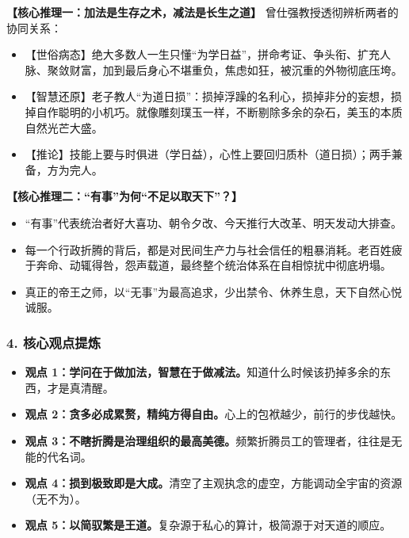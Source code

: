 \noindent\textbf{【核心推理一：加法是生存之术，减法是长生之道】}
曾仕强教授透彻辨析两者的协同关系：
\begin{itemize}
    \item 【世俗病态】绝大多数人一生只懂“为学日益”，拼命考证、争头衔、扩充人脉、聚敛财富，加到最后身心不堪重负，焦虑如狂，被沉重的外物彻底压垮。
    \item 【智慧还原】老子教人“为道日损”：损掉浮躁的名利心，损掉非分的妄想，损掉自作聪明的小机巧。就像雕刻璞玉一样，不断剔除多余的杂石，美玉的本质自然光芒大盛。
    \item 【推论】技能上要与时俱进（学日益），心性上要回归质朴（道日损）；两手兼备，方为完人。
\end{itemize}

\noindent\textbf{【核心推理二：“有事”为何“不足以取天下”？】}
\begin{itemize}
    \item “有事”代表统治者好大喜功、朝令夕改、今天推行大改革、明天发动大排查。
    \item 每一个行政折腾的背后，都是对民间生产力与社会信任的粗暴消耗。老百姓疲于奔命、动辄得咎，怨声载道，最终整个统治体系在自相惊扰中彻底坍塌。
    \item 真正的帝王之师，以“无事”为最高追求，少出禁令、休养生息，天下自然心悦诚服。
\end{itemize}

\subsubsection{4. 核心观点提炼}
\begin{itemize}
    \item \textbf{观点 1：学问在于做加法，智慧在于做减法。}知道什么时候该扔掉多余的东西，才是真清醒。
    \item \textbf{观点 2：贪多必成累赘，精纯方得自由。}心上的包袱越少，前行的步伐越快。
    \item \textbf{观点 3：不瞎折腾是治理组织的最高美德。}频繁折腾员工的管理者，往往是无能的代名词。
    \item \textbf{观点 4：损到极致即是大成。}清空了主观执念的虚空，方能调动全宇宙的资源（无不为）。
    \item \textbf{观点 5：以简驭繁是王道。}复杂源于私心的算计，极简源于对天道的顺应。
\end{itemize}

